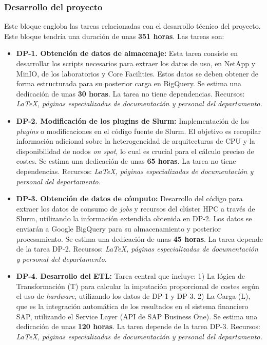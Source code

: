 \subsubsection{Desarrollo del proyecto}
Este bloque engloba las tareas relacionadas con el desarrollo técnico del proyecto. Este bloque
tendría una duración de unas \textbf{351 horas}. Las tareas son:
\begin{itemize}
    \item \textbf{DP-1. Obtención de datos de almacenaje:} Esta tarea consiste en desarrollar 
    los scripts necesarios para extraer los datos de uso, en NetApp y MinIO, de los laboratorios
    y Core Facilities. Estos datos se deben obtener de forma estructurada para su posterior carga 
    en BigQuery. Se estima una dedicación de unas \textbf{30 horas}.
    \newline La tarea no tiene dependencias.
    \newline Recursos: \textit {LaTeX, páginas especializadas de documentación y personal del departamento.}
    
    \item \textbf{DP-2. Modificación de los plugins de Slurm:} Implementación de los \textit{plugins} o modificaciones  en el código fuente de Slurm. 
    El objetivo es recopilar información adicional 
    sobre la heterogeneidad de arquitecturas de CPU y la disponibilidad de nodos \textit{on spot}, lo cual es crucial para el cálculo preciso de costes. 
    Se estima una dedicación de unas \textbf{65 horas}.
    \newline La tarea no tiene dependencias.
    \newline Recursos: \textit {LaTeX, páginas especializadas de documentación y personal del departamento.}
    
    \item \textbf{DP-3. Obtención de datos de cómputo:} Desarrollo del código para extraer los datos de consumo de \textit{jobs} y recursos del clúster HPC 
    a través de Slurm, utilizando la información extendida obtenida en DP-2. Los datos se enviarán a Google BigQuery para su almacenamiento 
    y posterior procesamiento. Se estima una dedicación de unas \textbf{45 horas}.
    \newline La tarea depende de la tarea DP-2.
    \newline Recursos: \textit {LaTeX, páginas especializadas de documentación y personal del departamento.}
    
    \item \textbf{DP-4. Desarrollo del ETL:}  Tarea central que incluye: 1) La lógica de Transformación (T) para calcular la imputación proporcional de costes 
    según el uso de \textit{hardware}, utilizando los datos de DP-1 y DP-3. 2) La Carga (L), que es la integración automática de los resultados en el sistema 
    financiero SAP, utilizando el Service Layer (API de SAP Business One). Se estima una dedicación de unas \textbf{120 horas}.
    \newline La tarea depende de la tarea DP-3.
    \newline Recursos: \textit {LaTeX, páginas especializadas de documentación y personal del departamento.}
    

\end{itemize}
